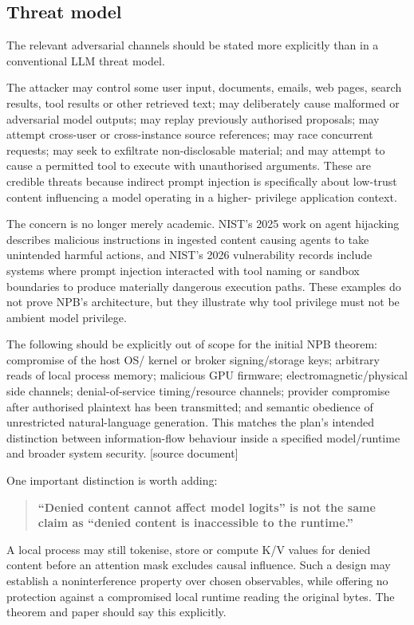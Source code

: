 \documentclass[11pt,a4paper]{article}
\begin{document}
\subsection*{Threat model}
The relevant adversarial channels should be stated more explicitly than in a conventional LLM threat model.\par
The attacker may control some user input, documents, emails, web pages, search results, tool results or other retrieved text; may deliberately cause malformed or adversarial model outputs; may replay previously authorised proposals; may attempt cross-user or cross-instance source references; may race concurrent requests; may seek to exfiltrate non-disclosable material; and may attempt to cause a permitted tool to execute with unauthorised arguments. These are credible threats because indirect prompt injection is specifically about low-trust content influencing a model operating in a higher- privilege application context.\par
The concern is no longer merely academic. NIST's 2025 work on agent hijacking describes malicious instructions in ingested content causing agents to take unintended harmful actions, and NIST's 2026 vulnerability records include systems where prompt injection interacted with tool naming or sandbox boundaries to produce materially dangerous execution paths. These examples do not prove NPB's architecture, but they illustrate why tool privilege must not be ambient model privilege.\par
The following should be explicitly out of scope for the initial NPB theorem: compromise of the host OS/ kernel or broker signing/storage keys; arbitrary reads of local process memory; malicious GPU firmware; electromagnetic/physical side channels; denial-of-service timing/resource channels; provider compromise after authorised plaintext has been transmitted; and semantic obedience of unrestricted natural-language generation. This matches the plan's intended distinction between information-flow behaviour inside a specified model/runtime and broader system security. [source document]\par
One important distinction is worth adding:\par
\begin{quote}\textbf{“Denied content cannot affect model logits” is not the same claim as “denied content is inaccessible to the runtime.”}\end{quote}
A local process may still tokenise, store or compute K/V values for denied content before an attention mask excludes causal influence. Such a design may establish a noninterference property over chosen observables, while offering no protection against a compromised local runtime reading the original bytes. The theorem and paper should say this explicitly.\par
\end{document}
